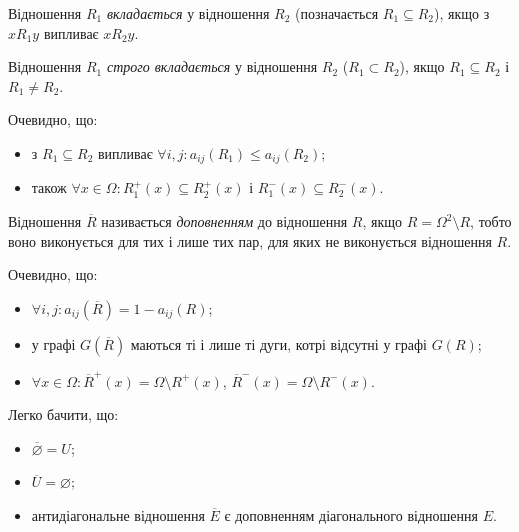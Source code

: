 \begin{definition}
	Відношення $R_1$ \textit{вкладається} у відношення $R_2$ (позначається $R_1 \subseteq R_2$), якщо з $x R_1 y$ випливає $x R_2 y$.
\end{definition}

\begin{definition}
	Відношення $R_1$ \textit{строго вкладається} у відношення $R_2$ ($R_1 \subset R_2$), якщо $R_1 \subseteq R_2$ і $R_1 \ne R_2$.
\end{definition}

\begin{properties}
	Очевидно, що:
	\begin{itemize}
	 	\item з $R_1 \subseteq R_2$ випливає $\forall i, j: a_{ij}(R_1) \le a_{ij}(R_2)$; 
	 	\item також $\forall x \in \Omega: R_1^+(x) \subseteq R_2^+(x)$ і $R_1^-(x) \subseteq R_2^-(x)$.
	\end{itemize}
\end{properties}

\begin{definition}
	Відношення $\overline{R}$ називається \textit{доповненням} до відношення $R$, якщо $R = \Omega^2 \setminus R$, тобто воно виконується для тих і лише тих пар, для яких не виконується відношення $R$.
\end{definition}

\begin{properties}
	Очевидно, що:
	\begin{itemize}
		\item $\forall i, j: a_{ij}(\overline{R}) = 1 - a_{ij}(R)$;
		\item у графі $G(\overline{R})$ маються ті і лише ті дуги, котрі відсутні у графі $G(R)$;
		\item $\forall x \in \Omega: \overline{R}^+(x) = \Omega \setminus R^+(x)$, $\overline{R}^-(x) = \Omega \setminus R^-(x)$.
	\end{itemize}
\end{properties}

\begin{examples}
	Легко бачити, що:
	\begin{itemize}
		\item $\overline{\varnothing} = U$;
		\item $\overline{U} = \varnothing$;
		\item антидіагональне відношення $\overline{E}$ є доповненням діагонального відношення $E$.
	\end{itemize}
\end{examples}

